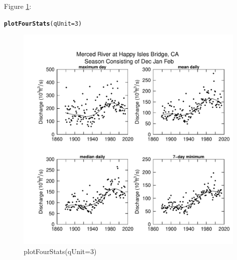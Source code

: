 \documentclass[a4paper,11pt]{article}\usepackage[]{graphicx}\usepackage[]{color}
\makeatletter
\newcommand{\hlnum}[1]{\textcolor[rgb]{0.686,0.059,0.569}{#1}}%
\newcommand{\hlstd}[1]{\textcolor[rgb]{0.345,0.345,0.345}{#1}}%
\newcommand{\hlkwc}[1]{\textcolor[rgb]{0.333,0.667,0.333}{#1}}%
\newcommand{\hlkwd}[1]{\textcolor[rgb]{0.737,0.353,0.396}{\textbf{#1}}}%
\newenvironment{kframe}{%
 \def\at@end@of@kframe{}%
 \ifinner\ifhmode%
  \def\at@end@of@kframe{\end{minipage}}%
  \begin{minipage}{\columnwidth}%
 \fi\fi%
 \def\FrameCommand##1{\hskip\@totalleftmargin \hskip-\fboxsep
 \colorbox{shadecolor}{##1}\hskip-\fboxsep
     \hskip-\linewidth \hskip-\@totalleftmargin \hskip\columnwidth}%
 \MakeFramed {\advance\hsize-\width
   \@totalleftmargin\z@ \linewidth\hsize
   \@setminipage}}%
 {\par\unskip\endMakeFramed%
 \at@end@of@kframe}
\newenvironment{knitrout}{}{} %
\makeatother
\begin{document}
Figure \ref{fig:plotFourStats}:
\begin{knitrout}
\color{fgcolor}\begin{kframe}
\begin{alltt}
\hlkwd{plotFourStats}\hlstd{(}\hlkwc{qUnit}\hlstd{=}\hlnum{3}\hlstd{)}
\end{alltt}
\end{kframe}\begin{figure}[]

\includegraphics[width=1\linewidth,height=1\linewidth]{figure/plotFourStats} \caption[plotFourStats(qUnit=3)]{plotFourStats(qUnit=3)\label{fig:plotFourStats}}
\end{figure}


\end{knitrout}


\FloatBarrier
\end{document}
